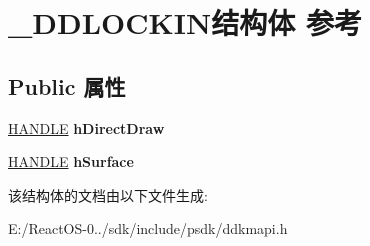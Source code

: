 \hypertarget{struct___d_d_l_o_c_k_i_n}{}\section{\+\_\+\+D\+D\+L\+O\+C\+K\+I\+N结构体 参考}
\label{struct___d_d_l_o_c_k_i_n}
\subsection*{Public 属性}
\begin{DoxyCompactItemize}
\item 
\mbox{\label{struct___d_d_l_o_c_k_i_n_a0b17dd7732bbcb96a07c69786ba76ca0}} 
\hyperlink{interfacevoid}{H\+A\+N\+D\+LE} {\bfseries h\+Direct\+Draw}
\item 
\mbox{\label{struct___d_d_l_o_c_k_i_n_a1abfeadad587733f16a8928ca7e4689c}} 
\hyperlink{interfacevoid}{H\+A\+N\+D\+LE} {\bfseries h\+Surface}
\end{DoxyCompactItemize}


该结构体的文档由以下文件生成\+:\begin{DoxyCompactItemize}
\item 
E\+:/\+React\+O\+S-\/0../sdk/include/psdk/ddkmapi.\+h\end{DoxyCompactItemize}
